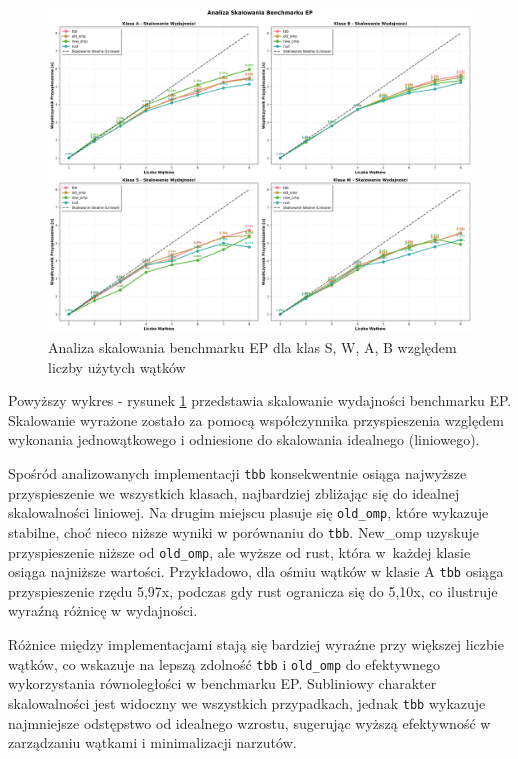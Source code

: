 \begin{figure}[H]
    \centering
    \includegraphics[width=\textwidth]{analiza/images/parallel/ep/arm/ep_analiza_skalowania.png}
    \caption{Analiza skalowania benchmarku EP dla klas S, W, A, B względem liczby użytych wątków}
    \label{ep_analiza_skalowania}
\end{figure}
Powyższy wykres - rysunek \ref{ep_analiza_skalowania} przedstawia skalowanie wydajności benchmarku EP. Skalowanie wyrażone zostało za pomocą współczynnika przyspieszenia względem wykonania jednowątkowego i odniesione do skalowania idealnego (liniowego).

Spośród analizowanych implementacji \texttt{tbb} konsekwentnie osiąga najwyższe przyspieszenie we wszystkich klasach, najbardziej zbliżając się do idealnej skalowalności liniowej. Na drugim miejscu plasuje się \texttt{old\_omp}, które wykazuje stabilne, choć nieco niższe wyniki w porównaniu do \texttt{tbb}. New\_omp uzyskuje przyspieszenie niższe od \texttt{old\_omp}, ale wyższe od rust, która w~każdej klasie osiąga najniższe wartości. Przykładowo, dla ośmiu wątków w klasie A \texttt{tbb} osiąga przyspieszenie rzędu 5,97x, podczas gdy rust ogranicza się do 5,10x, co ilustruje wyraźną różnicę w wydajności.

Różnice między implementacjami stają się bardziej wyraźne przy większej liczbie wątków, co wskazuje na lepszą zdolność \texttt{tbb} i \texttt{old\_omp} do efektywnego wykorzystania równoległości w benchmarku EP. Subliniowy charakter skalowalności jest widoczny we wszystkich przypadkach, jednak \texttt{tbb} wykazuje najmniejsze odstępstwo od idealnego wzrostu, sugerując wyższą efektywność w zarządzaniu wątkami i minimalizacji narzutów.

